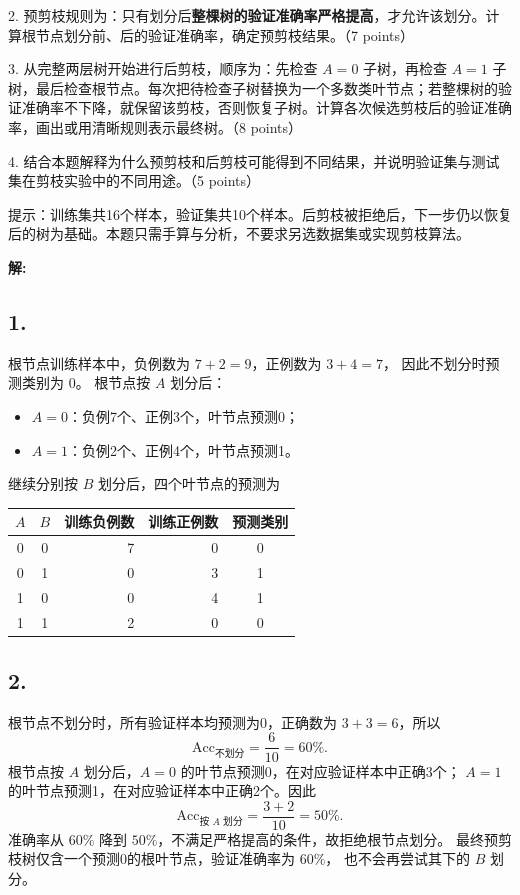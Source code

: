 \documentclass[10pt]{article}
\begin{document}
2. 预剪枝规则为：只有划分后\textbf{整棵树的验证准确率严格提高}，才允许该划分。计算根节点划分前、后的验证准确率，确定预剪枝结果。（7 points）

3. 从完整两层树开始进行后剪枝，顺序为：先检查 $A=0$ 子树，再检查 $A=1$ 子树，最后检查根节点。每次把待检查子树替换为一个多数类叶节点；若整棵树的验证准确率不下降，就保留该剪枝，否则恢复子树。计算各次候选剪枝后的验证准确率，画出或用清晰规则表示最终树。（8 points）

4. 结合本题解释为什么预剪枝和后剪枝可能得到不同结果，并说明验证集与测试集在剪枝实验中的不同用途。（5 points）

\noindent 提示：训练集共16个样本，验证集共10个样本。后剪枝被拒绝后，下一步仍以恢复后的树为基础。本题只需手算与分析，不要求另选数据集或实现剪枝算法。

\textbf{\large 解:}

\subsection*{1.}
根节点训练样本中，负例数为 $7+2=9$，正例数为 $3+4=7$，
因此不划分时预测类别为 ${0}$。
根节点按 $A$ 划分后：
\begin{itemize}
\item $A=0$：负例7个、正例3个，叶节点预测0；
\item $A=1$：负例2个、正例4个，叶节点预测1。
\end{itemize}
继续分别按 $B$ 划分后，四个叶节点的预测为
\begin{center}
\begin{tabular}{cc|rr|c}
\toprule
$A$ & $B$ & 训练负例数 & 训练正例数 & 预测类别\\
\midrule
0 & 0 & 7 & 0 & 0\\
0 & 1 & 0 & 3 & 1\\
1 & 0 & 0 & 4 & 1\\
1 & 1 & 2 & 0 & 0\\
\bottomrule
\end{tabular}
\end{center}

\subsection*{2.}
根节点不划分时，所有验证样本均预测为0，正确数为 $3+3=6$，所以
\[
\mathrm{Acc}_{\text{不划分}}=\frac6{10}=60\%.
\]
根节点按 $A$ 划分后，$A=0$ 的叶节点预测0，在对应验证样本中正确3个；
$A=1$ 的叶节点预测1，在对应验证样本中正确2个。因此
\[
\mathrm{Acc}_{\text{按 }A\text{ 划分}}=\frac{3+2}{10}=50\%.
\]
准确率从 $60\%$ 降到 $50\%$，不满足严格提高的条件，故拒绝根节点划分。
最终预剪枝树仅含一个预测0的根叶节点，验证准确率为 ${60\%}$，
也不会再尝试其下的 $B$ 划分。
\end{document}
